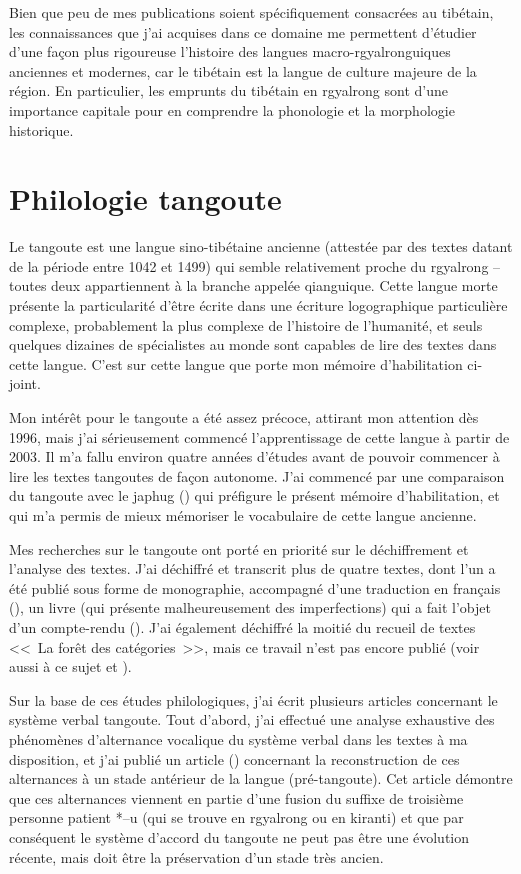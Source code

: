 \documentclass[oldfontcommands,oneside,a4paper,11pt]{memoir}
\begin{document}
Bien que peu de mes publications soient spécifiquement consacrées au tibétain, les connaissances que j’ai acquises dans ce domaine me permettent d’étudier d’une façon plus rigoureuse l’histoire des langues macro-rgyalronguiques anciennes et modernes, car le tibétain est la langue de culture majeure de la région. En particulier, les emprunts du tibétain en rgyalrong sont d'une importance capitale pour en comprendre la phonologie et la morphologie historique.

\section{Philologie tangoute}
	Le tangoute est une langue sino-tibétaine ancienne (attestée par des textes datant de la période entre 1042 et 1499) qui semble relativement proche du rgyalrong – toutes deux appartiennent à la branche appelée qianguique. Cette langue morte présente la particularité d’être écrite dans une écriture logographique particulière complexe, probablement la plus complexe de l’histoire de l’humanité, et seuls quelques dizaines de spécialistes au monde sont capables de lire des textes dans cette langue. C'est sur cette langue que porte mon mémoire d'habilitation ci-joint.
	
	Mon intérêt pour le tangoute a été assez précoce, attirant mon attention dès 1996, mais j'ai sérieusement commencé l'apprentissage de cette langue à partir de 2003. Il m'a fallu environ quatre années d'études avant de pouvoir commencer à lire les textes tangoutes de façon autonome. J'ai commencé par une comparaison du tangoute avec le japhug (\citealt{jacques06comparaison}) qui préfigure le présent mémoire d'habilitation, et qui m'a permis de mieux mémoriser le vocabulaire de cette langue ancienne.
	
	Mes recherches sur le tangoute ont porté en priorité sur le déchiffrement et l’analyse des textes. J’ai déchiffré et transcrit plus de quatre textes, dont l’un a été publié sous forme de monographie, accompagné d’une traduction en français (\citealt{jacques07textes}), un livre (qui présente malheureusement des imperfections) qui a fait l'objet d'un compte-rendu (\citealt{zaitsev09}). J'ai également déchiffré la moitié du recueil de textes <<~La forêt des catégories~>>, mais ce travail n'est pas encore publié (voir aussi à ce sujet \citealt{kepping83} et \citealt{leilin90}).
	

	Sur la base de ces études philologiques, j’ai écrit plusieurs articles concernant le système verbal tangoute. Tout d’abord, j’ai effectué une analyse exhaustive des phénomènes d’alternance vocalique du système verbal dans les textes à ma disposition, et j'ai publié un article (\citealt{jacques09tangutverb}) concernant la reconstruction de ces alternances à un stade antérieur de la langue (pré-tangoute). Cet article démontre que ces alternances viennent en partie d'une fusion du suffixe de troisième personne patient *--u (qui se trouve en rgyalrong ou en kiranti) et  que par conséquent  le système d'accord du tangoute ne peut pas être une évolution récente, mais doit être la préservation d'un stade très ancien.
	
\end{document}
